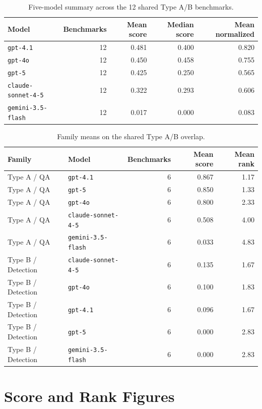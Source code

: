 \documentclass[11pt,a4paper]{article}
\newcommand{\code}[1]{\texttt{#1}}
\begin{document}
\begin{table}[H]
\centering
\small
\caption{Five-model summary across the 12 shared Type A/B benchmarks.}
\begin{tabularx}{\textwidth}{@{}lrrrr@{}}
\toprule
\textbf{Model} & \textbf{Benchmarks} & \textbf{Mean score} & \textbf{Median score} & \textbf{Mean normalized} \\
\midrule
\code{gpt-4.1} & 12 & 0.481 & 0.400 & 0.820 \\
\code{gpt-4o} & 12 & 0.450 & 0.458 & 0.755 \\
\code{gpt-5} & 12 & 0.425 & 0.250 & 0.565 \\
\code{claude-sonnet-4-5} & 12 & 0.322 & 0.293 & 0.606 \\
\code{gemini-3.5-flash} & 12 & 0.017 & 0.000 & 0.083 \\
\bottomrule
\end{tabularx}
\end{table}

\begin{table}[H]
\centering
\small
\caption{Family means on the shared Type A/B overlap.}
\begin{tabularx}{\textwidth}{@{}llrrr@{}}
\toprule
\textbf{Family} & \textbf{Model} & \textbf{Benchmarks} & \textbf{Mean score} & \textbf{Mean rank} \\
\midrule
Type A / QA & \code{gpt-4.1} & 6 & 0.867 & 1.17 \\
Type A / QA & \code{gpt-5} & 6 & 0.850 & 1.33 \\
Type A / QA & \code{gpt-4o} & 6 & 0.800 & 2.33 \\
Type A / QA & \code{claude-sonnet-4-5} & 6 & 0.508 & 4.00 \\
Type A / QA & \code{gemini-3.5-flash} & 6 & 0.033 & 4.83 \\
\midrule
Type B / Detection & \code{claude-sonnet-4-5} & 6 & 0.135 & 1.67 \\
Type B / Detection & \code{gpt-4o} & 6 & 0.100 & 1.83 \\
Type B / Detection & \code{gpt-4.1} & 6 & 0.096 & 1.67 \\
Type B / Detection & \code{gpt-5} & 6 & 0.000 & 2.83 \\
Type B / Detection & \code{gemini-3.5-flash} & 6 & 0.000 & 2.83 \\
\bottomrule
\end{tabularx}
\end{table}

\section{Score and Rank Figures}
\end{document}
